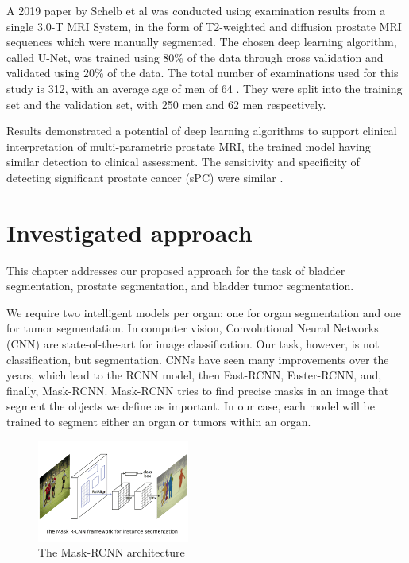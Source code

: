 \documentclass[runningheads,a4paper,11pt]{report}
\begin{document}
A 2019 paper by Schelb et al \cite{schelb2019classification} was conducted using examination results from a single 3.0-T MRI System, in the form of T2-weighted and diffusion prostate MRI sequences which were manually segmented. The chosen deep learning algorithm, called U-Net, was trained using 80\% of the data through cross validation and validated using 20\% of the data. The total number of examinations used for this study is 312, with an average age of men of 64 \cite{schelb2019classification}. They were split into the training set and the validation set, with 250 men and 62 men respectively. 

Results demonstrated a potential of deep learning algorithms to support clinical interpretation of multi-parametric prostate MRI, the trained model having similar detection to clinical assessment. The sensitivity and specificity of detecting significant prostate cancer (sPC) were similar \cite{schelb2019classification}. 

\chapter{Investigated approach}
\label{chapter:proposedApproach}

This chapter addresses our proposed approach for the task of bladder segmentation, prostate segmentation, and bladder tumor segmentation.

We require two intelligent models per organ: one for organ segmentation and one for tumor segmentation. In computer vision, Convolutional Neural Networks (CNN) are state-of-the-art for image classification. Our task, however, is not classification, but segmentation. CNNs have seen many improvements over the years, which lead to the RCNN model, then Fast-RCNN, Faster-RCNN, and, finally, Mask-RCNN. Mask-RCNN tries to find precise masks in an image that segment the objects we define as important. In our case, each model will be trained to segment either an organ or tumors within an organ.

\begin{figure}[htbp]
	\centerline{\includegraphics[width=5cm]{images/maskrcnn.png}}
	\caption{The Mask-RCNN architecture}
	\label{maskrcnn}
\end{figure}
\end{document}
